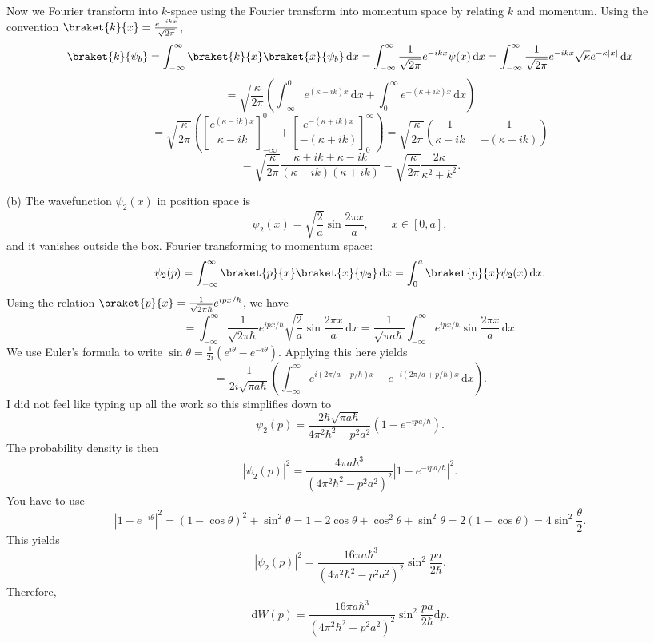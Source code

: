 \documentclass[11pt, letterpaper]{article}
\begin{document}
Now we Fourier transform into $k$-space using the Fourier transform into momentum space by relating $k$ and momentum. Using the convention $\braket{k}{x}=\frac{e^{-ikx} }{\sqrt{2\pi } } $,
\[
	\braket{k}{\psi _b} = \int_{-\infty }^{\infty } \braket{k}{x}\braket{x}{\psi _b} \,\mathrm{d} x = \int_{-\infty }^{\infty } \frac{1}{\sqrt{2\pi } } e^{-ikx} \psi(x) \,\mathrm{d} x=\int_{-\infty }^{\infty } \frac{1}{\sqrt{2\pi } } e^{-ikx} \sqrt{\kappa } e^{-\kappa |x|}  \,\mathrm{d} x
\]
\[
	=\sqrt{\frac{\kappa }{2\pi } } \left(\int_{-\infty }^{0} e^{(\kappa -ik)x}  \,\mathrm{d} x + \int_{0}^{\infty } e^{-(\kappa +ik)x}  \,\mathrm{d} x\right)
\]
\[
	=\sqrt{\frac{\kappa }{2\pi } } \left(\left[ \frac{e^{(\kappa -ik)x} }{\kappa -ik}  \right]_{-\infty } ^0 + \left[ \frac{e^{-(\kappa +ik)x} }{-(\kappa +ik)}  \right]_0^{\infty } \right)=\sqrt{\frac{\kappa }{2\pi } } \left( \frac{1}{\kappa -ik} -\frac{1}{-(\kappa +ik)}  \right) 
\]
\[
	=\sqrt{\frac{\kappa }{2\pi } } \frac{\kappa +ik+\kappa -ik}{\left( \kappa -ik \right) \left( \kappa +ik \right) } =\sqrt{\frac{\kappa }{2\pi } } \frac{2\kappa }{\kappa ^2+k^2} 
.\]

(b) The wavefunction $\psi _2(x)$ in position space is
\[
	\psi _2(x)=\sqrt{\frac{2}{a} } \sin \frac{2\pi x}{a} ,\qquad x\in[0,a]
,\]
and it vanishes outside the box. Fourier transforming to momentum space:
\[
	\psi _2(p) = \int_{-\infty }^{\infty } \braket{p}{x}\braket{x}{\psi _2} \,\mathrm{d} x=\int_{0}^{a} \braket{p}{x}\psi _2(x) \,\mathrm{d} x
.\]
Using the relation $\braket{p}{x}=\frac{1}{\sqrt{2\pi \hbar} } e^{ipx/\hbar} $, we have
\[
	=\int_{-\infty }^{\infty } \frac{1}{\sqrt{2\pi \hbar} } e^{ipx/\hbar} \sqrt{\frac{2}{a} } \sin \frac{2\pi x}{a}  \,\mathrm{d} x=\frac{1}{\sqrt{\pi a\hbar} } \int_{-\infty }^{\infty } e^{ipx/\hbar} \sin \frac{2\pi x}{a}  \,\mathrm{d} x
.\]
We use Euler's formula to write $\sin \theta =\frac{1}{2i} (e^{i\theta } -e^{-i\theta }) $. Applying this here yields
\[
	=\frac{1}{2i\sqrt{\pi a\hbar} } \left( \int_{-\infty }^{\infty } e^{i(2\pi /a -p/\hbar)x} -e^{-i(2\pi /a + p/\hbar)x}  \,\mathrm{d} x \right) 
.\]
I did not feel like typing up all the work so this simplifies down to
\[
	\psi _2(p)=\frac{2\hbar \sqrt{\pi a\hbar}}{4\pi^2\hbar^2 - p^2a^2} \left( 1-e^{-ipa/\hbar}  \right) 
.\]
The probability density is then
\[
	\left| \psi _2(p) \right| ^2 = \frac{4\pi a\hbar^3}{\left( 4\pi^2\hbar^2 - p^2a^2 \right) ^2} \left| 1-e^{-ipa/\hbar}  \right| ^2
.\]
You have to use
\[
	\left| 1-e^{-i\theta }  \right| ^2 = (1-\cos\theta )^2 + \sin ^2\theta =1-2 \cos \theta +\cos ^2\theta +\sin ^2\theta = 2\left( 1-\cos \theta  \right) =4 \sin ^2\frac{\theta }{2} 
.\]
This yields
\[
	\left| \psi _2(p) \right| ^2 = \frac{16\pi a\hbar^3}{\left( 4\pi ^2\hbar^2 - p^2a^2 \right) ^2} \sin ^2\frac{pa}{2\hbar} 
.\]
Therefore,
\[
	\mathrm{d} W(p) = \frac{16\pi a\hbar^3}{\left( 4\pi ^2\hbar^2 - p^2a^2 \right) ^2} \sin ^2\frac{pa}{2\hbar} \mathrm{d}p 
.\]
\end{document}
